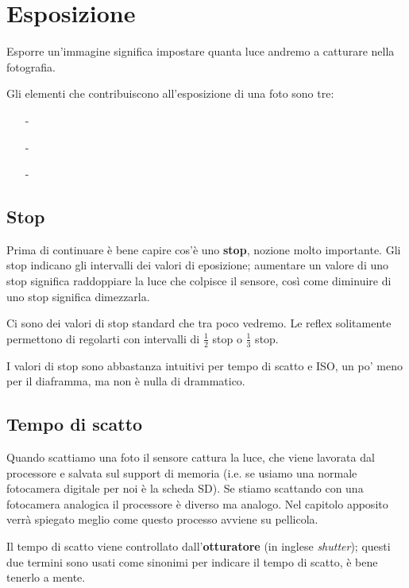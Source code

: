 \section{Esposizione}
Esporre un'immagine significa impostare quanta luce andremo a catturare nella fotografia.

Gli elementi che contribuiscono all'esposizione di una foto sono tre:
\begin{itemize}
    \item[-] \textbf{}
    \item[-] \textbf{}
    \item[-] \textbf{}
\end{itemize}

\subsection{Stop}
Prima di continuare è bene capire cos'è uno \textbf{stop}, nozione molto importante.\newline
Gli stop indicano gli intervalli dei valori di eposizione; aumentare un valore di uno stop
significa raddoppiare la luce che colpisce il sensore, così come diminuire di uno stop
significa dimezzarla.

Ci sono dei valori di stop standard che tra poco vedremo. Le reflex solitamente permettono di regolarti con intervalli di $\frac{1}{2}$ stop o $\frac{1}{3}$ stop.

I valori di stop sono abbastanza intuitivi per tempo di scatto e ISO, un po' meno per il diaframma, ma non è nulla di drammatico.


\subsection{Tempo di scatto} \label{subsec:shuttertime}
Quando scattiamo una foto il sensore cattura la luce, che viene lavorata dal processore e salvata sul support di memoria (i.e. se usiamo una normale fotocamera digitale per noi è la scheda SD).\newline
Se stiamo scattando con una fotocamera analogica il processore è diverso ma analogo. Nel capitolo apposito verrà spiegato meglio come questo processo avviene su pellicola.

Il tempo di scatto viene controllato dall'\textbf{otturatore} (in inglese \textit{shutter}); questi due termini sono usati come sinonimi per indicare il tempo di scatto, è bene tenerlo a mente.

